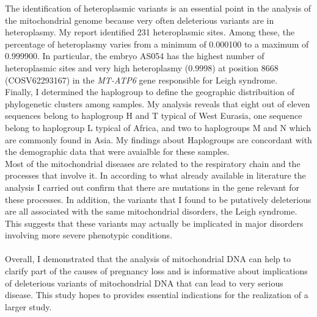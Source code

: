 The identification of heteroplasmic variants is an essential point in the analysis of the mitochondrial genome because very often deleterious variants are in heteroplasmy. My report identified 231 heteroplasmic sites. Among these, the percentage of heteroplasmy varies from a minimum of 0.000100  to a maximum of 0.999900. In particular, the embryo AS054 has the highest number of heteroplasmic sites and very high heteroplasmy (0.9998) at position 8668 (COSV62293167) in the \textit{MT-ATP6} gene responsible for Leigh syndrome.\\


Finally, I determined the haplogroup to  define the geographic distribuition of phylogenetic clusters among samples. My analysis reveals that eight out of eleven sequences belong to haplogroup H and T typical of West Eurasia, one sequence belong to haplogroup L typical of Africa, and two to haplogroups M and N which are commonly found in Asia. My findings about Haplogroups are concordant with the demographic data that were avaialble for these samples. \\



Most of the mitochondrial diseases are related to the respiratory chain and the processes that involve it. In according to what already available in literature the analysis I carried out confirm that there are mutations in the gene relevant for these processes. In addition, the variants that I found to be putatively deleterious are all associated with the same mitochondrial disorders, the Leigh syndrome. This suggests that these variants may actually be implicated in major disorders involving more severe phenotypic conditions.\\
 \\


Overall, I demonstrated that the analysis of mitochondrial DNA can help to clarify part of the causes of pregnancy loss and is informative about implications of deleterious variants of mitochondrial DNA that can lead to very serious disease. This study hopes to provides essential indications for the realization of a larger study.







